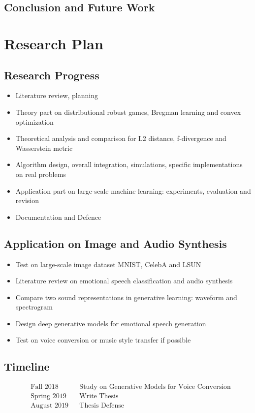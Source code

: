 \documentclass{article}
\begin{document}
\subsection{Conclusion and Future Work}



\section{Research Plan}
\label{Sec:Plan}

\subsection{Research Progress}
\begin{itemize}
\item[] Literature review, planning
\item[] Theory part on distributional robust games, Bregman learning and convex optimization
\item[] Theoretical analysis and comparison for L2 distance, f-divergence and Wasserstein metric
\item[] Algorithm design, overall integration, simulations, specific implementations on real problems
\item[] Application part on large-scale machine learning: experiments, evaluation and revision
\item[] Documentation and Defence
\end{itemize}

\subsection{Application on Image and Audio Synthesis}
\begin{itemize}
\item Test on large-scale image dataset MNIST, CelebA and LSUN
\item Literature review on emotional speech classification and audio synthesis
\item Compare two sound representations in generative learning: waveform and spectrogram
\item Design deep generative models for emotional speech generation
\item Test on voice conversion or music style transfer if possible
\end{itemize}


\subsection{Timeline}
\begin{align*}
&\text{Fall 2018} && \text{Study on Generative Models for Voice Conversion} \\
&\text{Spring 2019} && \text{Write Thesis} \\
&\text{August 2019} && \text{Thesis Defense}
\end{align*}
\end{document}
